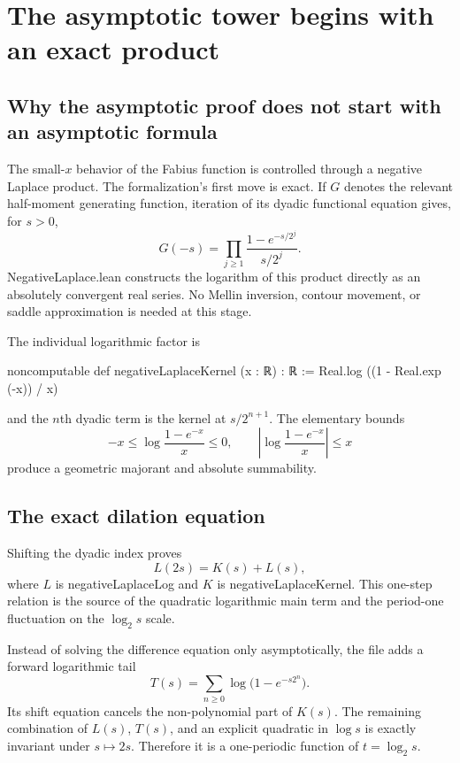 \documentclass[11pt,a4paper,openany]{book}
\def\module#1{#1.lean}
\def\decl#1{#1}
\newcommand{\module}[1]{\nolinkurl{#1.lean}}
\newcommand{\decl}[1]{\texttt{\detokenize{#1}}}
\begin{document}
\chapter{The asymptotic tower begins with an exact product}
\label{ch:negative-laplace}

\section{Why the asymptotic proof does not start with an asymptotic formula}
The small-$x$ behavior of the Fabius function is controlled through a negative
Laplace product.  The formalization's first move is exact.  If $G$ denotes the
relevant half-moment generating function, iteration of its dyadic functional
equation gives, for $s>0$,
\[
 G(-s)=\prod_{j\ge1}
   \frac{1-e^{-s/2^j}}{s/2^j}.
\]
\module{NegativeLaplace} constructs the logarithm of this product directly as
an absolutely convergent real series.  No Mellin inversion, contour movement,
or saddle approximation is needed at this stage.

The individual logarithmic factor is

\begin{LeanCode}
noncomputable def negativeLaplaceKernel (x : ℝ) : ℝ :=
  Real.log ((1 - Real.exp (-x)) / x)
\end{LeanCode}

and the $n$th dyadic term is the kernel at $s/2^{n+1}$.  The elementary bounds
\[
 -x\le \log\frac{1-e^{-x}}x\le0,
 \qquad
 \left|\log\frac{1-e^{-x}}x\right|\le x
\]
produce a geometric majorant and absolute summability.

\section{The exact dilation equation}
Shifting the dyadic index proves
\[
 L(2s)=K(s)+L(s),
\]
where $L$ is \decl{negativeLaplaceLog} and $K$ is
\decl{negativeLaplaceKernel}.  This one-step relation is the source of the
quadratic logarithmic main term and the period-one fluctuation on the
$\log_2s$ scale.

Instead of solving the difference equation only asymptotically, the file adds
a forward logarithmic tail
\[
 T(s)=\sum_{n\ge0}\log\bigl(1-e^{-s2^n}\bigr).
\]
Its shift equation cancels the non-polynomial part of $K(s)$.  The remaining
combination of $L(s)$, $T(s)$, and an explicit quadratic in $\log s$ is exactly
invariant under $s\mapsto2s$.  Therefore it is a one-periodic function of
$t=\log_2s$.
\end{document}
